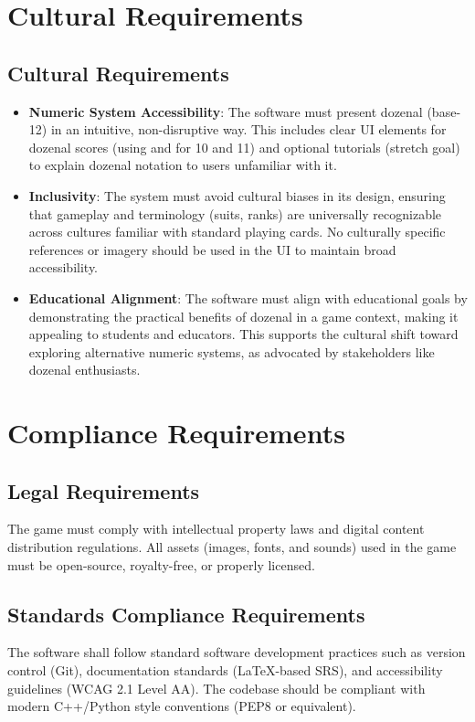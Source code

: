 \documentclass[12pt]{article}
\begin{document}
\section{Cultural Requirements}
\subsection{Cultural Requirements}

\begin{itemize}
    \item \textbf{Numeric System Accessibility}: The software must present dozenal (base-12) in an intuitive, non-disruptive way. This includes clear UI elements for dozenal scores (using  and  for 10 and 11) and optional tutorials (stretch goal) to explain dozenal notation to users unfamiliar with it.
    \item \textbf{Inclusivity}: The system must avoid cultural biases in its design, ensuring that gameplay and terminology (suits, ranks) are universally recognizable across cultures familiar with standard playing cards. No culturally specific references or imagery should be used in the UI to maintain broad accessibility.
    \item \textbf{Educational Alignment}: The software must align with educational goals by demonstrating the practical benefits of dozenal in a game context, making it appealing to students and educators. This supports the cultural shift toward exploring alternative numeric systems, as advocated by stakeholders like dozenal enthusiasts.
\end{itemize}

\section{Compliance Requirements}

\subsection{Legal Requirements}
The game must comply with intellectual property laws and digital content distribution regulations.
All assets (images, fonts, and sounds) used in the game must be open-source, royalty-free, or properly licensed.

\subsection{Standards Compliance Requirements}
The software shall follow standard software development practices such as version control (Git), documentation standards (LaTeX-based SRS), and accessibility guidelines (WCAG 2.1 Level AA).
The codebase should be compliant with modern C++/Python style conventions (PEP8 or equivalent).
\end{document}
